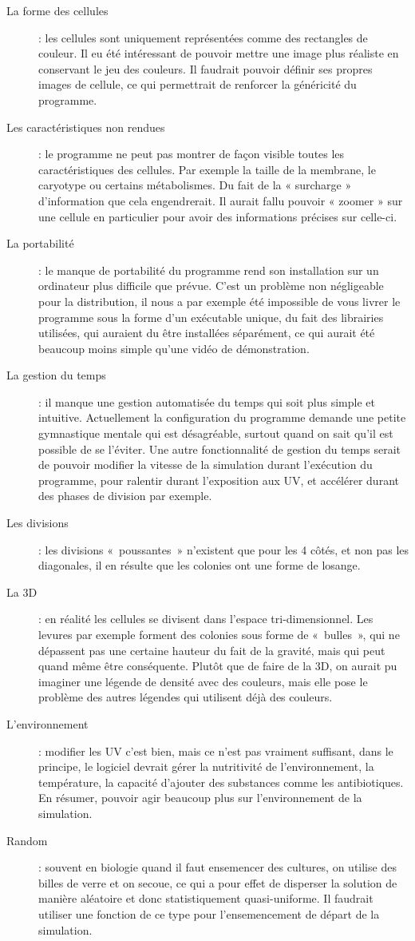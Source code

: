 \begin{description}
  \item[La forme des cellules] : les cellules sont uniquement représentées comme des rectangles de couleur. Il eu été intéressant de pouvoir mettre une image plus réaliste en conservant le jeu des couleurs. Il faudrait pouvoir définir ses propres images de cellule, ce qui permettrait de renforcer la généricité du programme.
  \item[Les caractéristiques non rendues] : le programme ne peut pas montrer de façon visible toutes les caractéristiques des cellules. Par exemple la taille de la membrane, le caryotype ou certains métabolismes. Du fait de la « surcharge » d'information que cela engendrerait. Il aurait fallu pouvoir « zoomer » sur une cellule en particulier pour avoir des informations précises sur celle-ci.
  \item[La portabilité] : le manque de portabilité du programme rend son installation sur un ordinateur plus difficile que prévue. C'est un problème non négligeable pour la distribution, il nous a par exemple été impossible de vous livrer le programme sous la forme d'un exécutable unique, du fait des librairies utilisées, qui auraient du être installées séparément, ce qui aurait été beaucoup moins simple qu'une vidéo de démonstration.
  \item[La gestion du temps] : il manque une gestion automatisée du temps qui soit plus simple et intuitive. Actuellement la configuration du programme demande une petite gymnastique mentale qui est désagréable, surtout quand on sait qu'il est possible de se l'éviter. Une autre fonctionnalité de gestion du temps serait de pouvoir modifier la vitesse de la simulation durant l'exécution du programme, pour ralentir durant l'exposition aux UV, et accélérer durant des phases de division par exemple.
  \item[Les divisions] : les divisions «~poussantes~» n'existent que pour les 4 côtés, et non pas les diagonales, il en résulte que les colonies ont une forme de losange.
  \item[La 3D] : en réalité les cellules se divisent dans l'espace tri-dimensionnel. Les levures par exemple forment des colonies sous forme de «~bulles~», qui ne dépassent pas une certaine hauteur du fait de la gravité, mais qui peut quand même être conséquente. Plutôt que de faire de la 3D, on aurait pu imaginer une légende de densité avec des couleurs, mais elle pose le problème des autres légendes qui utilisent déjà des couleurs.
  \item[L'environnement] : modifier les UV c'est bien, mais ce n'est pas vraiment suffisant, dans le principe, le logiciel devrait gérer la nutritivité de l'environnement, la température, la capacité d'ajouter des substances comme les antibiotiques. En résumer, pouvoir agir beaucoup plus sur l'environnement de la simulation.
  \item[Random] : souvent en biologie quand il faut ensemencer des cultures, on utilise des billes de verre et on secoue, ce qui a pour effet de disperser la solution de manière aléatoire et donc statistiquement quasi-uniforme. Il faudrait utiliser une fonction de ce type pour l’ensemencement de départ de la simulation.
\end{description}
